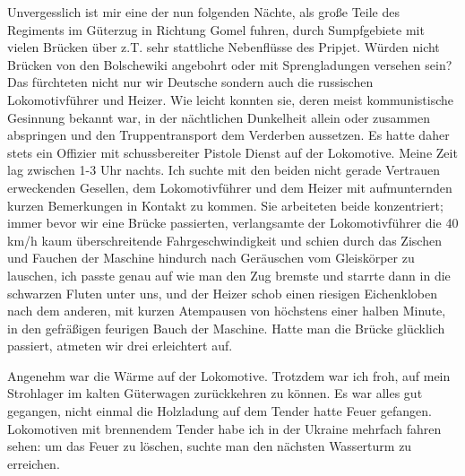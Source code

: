 Unvergesslich ist mir eine der nun folgenden Nächte, als große Teile des Regiments im Güterzug in Richtung Gomel fuhren, durch Sumpfgebiete mit vielen Brücken über z.T. sehr stattliche Nebenflüsse des Pripjet. Würden nicht Brücken von den Bolschewiki angebohrt oder mit Sprengladungen versehen sein? Das fürchteten nicht nur wir Deutsche sondern auch die russischen Lokomotivführer und Heizer. Wie leicht konnten sie, deren meist kommunistische Gesinnung bekannt war, in der nächtlichen Dunkelheit allein oder zusammen abspringen und den Truppentransport dem Verderben aussetzen. Es hatte daher stets ein Offizier mit schussbereiter Pistole Dienst auf der Lokomotive. Meine Zeit lag zwischen 1-3 Uhr nachts. Ich suchte mit den beiden nicht gerade Vertrauen erweckenden Gesellen, dem Lokomotivführer und dem Heizer mit aufmunternden kurzen Bemerkungen in Kontakt zu kommen. Sie arbeiteten beide konzentriert; immer bevor wir eine Brücke passierten, verlangsamte der Lokomotivführer die 40 km/h kaum überschreitende Fahrgeschwindigkeit und schien durch das Zischen und Fauchen der Maschine hindurch nach Geräuschen vom Gleiskörper zu lauschen, ich passte genau auf wie man den Zug bremste und starrte dann in die schwarzen Fluten unter uns, und der Heizer schob einen riesigen Eichenkloben nach dem anderen, mit kurzen Atempausen von höchstens einer halben Minute, in den gefräßigen feurigen Bauch der Maschine. Hatte man die Brücke glücklich passiert, atmeten wir drei erleichtert auf.

Angenehm war die Wärme auf der Lokomotive. Trotzdem war ich froh, auf mein Strohlager im kalten Güterwagen zurückkehren zu können. Es war alles gut gegangen, nicht einmal die Holzladung auf dem Tender hatte Feuer gefangen. Lokomotiven mit brennendem Tender habe ich in der Ukraine mehrfach fahren sehen: um das Feuer zu löschen, suchte man den nächsten Wasserturm zu erreichen.

